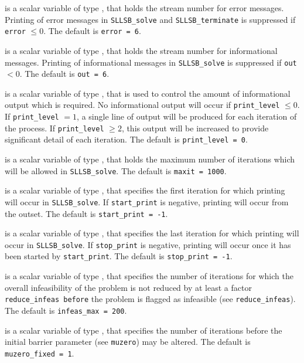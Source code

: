 \documentclass{galahad}
\newcommand{\packagename}{SLLSB}
\begin{document}
\begin{description}

 is a scalar variable of type \integer, that holds the
stream number for error messages. Printing of error messages in
{\tt \packagename\_solve} and {\tt \packagename\_terminate} is suppressed if
{\tt error} $\leq 0$.
The default is {\tt error = 6}.

 is a scalar variable of type \integer, that holds the
stream number for informational messages. Printing of informational messages in
{\tt \packagename\_solve} is suppressed if {\tt out} $< 0$.
The default is {\tt out = 6}.

 is a scalar variable of type \integer, that is used
to control the amount of informational output which is required. No
informational output will occur if {\tt print\_level} $\leq 0$. If
{\tt print\_level} $= 1$, a single line of output will be produced for each
iteration of the process. If {\tt print\_level} $\geq 2$, this output will be
increased to provide significant detail of each iteration.
The default is {\tt print\_level = 0}.

 is a scalar variable of type \integer, that holds the
maximum number of iterations which will be allowed in {\tt \packagename\_solve}.
The default is {\tt maxit = 1000}.

 is a scalar variable of type \integer, that specifies
the first iteration for which printing will occur in {\tt \packagename\_solve}.
If {\tt start\_print} is negative, printing will occur from the outset.
The default is {\tt start\_print = -1}.

 is a scalar variable of type \integer, that specifies
the last iteration for which printing will occur in  {\tt \packagename\_solve}.
If {\tt stop\_print} is negative, printing will occur once it has been
started by {\tt start\_print}.
The default is {\tt stop\_print = -1}.

 is a scalar variable of type \integer, that specifies
the number of iterations for which the overall infeasibility
of the problem is not reduced by at least a factor {\tt reduce\_infeas
before} the problem is flagged as infeasible (see {\tt reduce\_infeas}).
The default is {\tt infeas\_max = 200}.

 is a scalar variable of type \integer,
that specifies
the number of iterations before the initial barrier parameter
(see {\tt muzero}) may be altered.
The default is {\tt muzero\_fixed = 1}.


\end{description}
\end{document}
